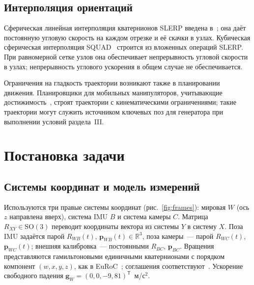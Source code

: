 \documentclass{misisarticle}
\newcommand{\R}{\mathbb{R}}
\newcommand{\SO}{\mathrm{SO}(3)}
\newcommand{\T}{^{\mathsf{T}}}
\newcommand{\vb}[1]{\mathbf{#1}}
\begin{document}
\subsection{Интерполяция ориентаций}

Сферическая линейная интерполяция кватернионов SLERP введена в~\cite{shoemake}; она даёт постоянную угловую скорость на каждом отрезке и её скачки в узлах. Кубическая сферическая интерполяция SQUAD~\cite{shoemake87} строится из вложенных операций SLERP. При равномерной сетке узлов она обеспечивает непрерывность угловой скорости в узлах; непрерывность углового ускорения в общем случае не обеспечивается.

Ограничения на гладкость траектории возникают также в планировании движения. Планировщики для мобильных манипуляторов, учитывающие достижимость~\cite{ly}, строят траектории с кинематическими ограничениями; такие траектории могут служить источником ключевых поз для генератора при выполнении условий раздела~III.

\section{Постановка задачи}

\subsection{Системы координат и модель измерений}

Используются три правые системы координат (рис.~\ref{fig:frames}): мировая $W$ (ось $z$ направлена вверх), система IMU $B$ и система камеры $C$. Матрица $R_{XY}\in\SO$ переводит координаты вектора из системы $Y$ в систему $X$. Поза IMU задаётся парой $R_{WB}(t)$, $\vb p_{WB}(t)\in\R^3$, поза камеры~--- парой $R_{WC}(t)$, $\vb p_{WC}(t)$; внешняя калибровка~--- постоянными $R_{BC}$, $\vb p_{BC}$. Вращения представляются гамильтоновыми единичными кватернионами с порядком компонент $(w,x,y,z)$, как в EuRoC~\cite{euroc}; соглашения соответствуют~\cite{sola}. Ускорение свободного падения $\vb g_W=(0,0,-9{,}81)\T$~м/с$^2$.
\end{document}

